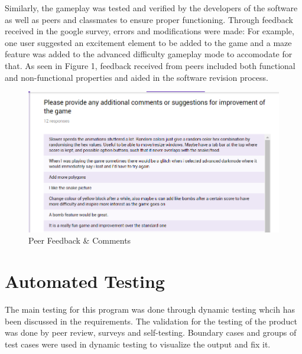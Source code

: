 \documentclass[12pt, titlepage]{article}
\begin{document}
Similarly, the gameplay was tested and verified by the developers of the software as well as peers and classmates to ensure proper functioning. Through feedback received in the google survey, errors and modifications were made: For example, one user suggested an excitement element to be added to the game and a maze feature was added to the advanced difficulty gameplay mode to accomodate for that. As seen in Figure 1, feedback received from peers included both functional and non-functional properties and aided in the software revision process.

\begin{figure}
  \includegraphics[width=\linewidth]{feedback.png}
  \caption{Peer Feedback \& Comments}
\end{figure} 

\section{Automated Testing}
The main testing for this program was done through dynamic testing whcih has been discussed in the requirements. The validation
for the testing of the product was done by peer review, surveys and self-testing. Boundary cases and groups of test cases were used in dynamic testing to visualize the output and fix it.
\end{document}
